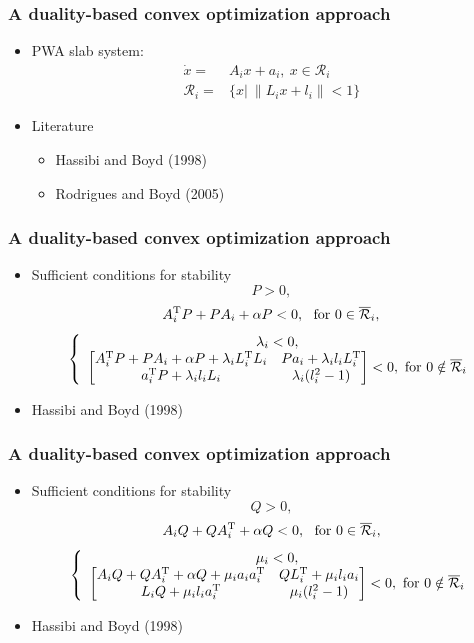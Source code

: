 \documentclass{beamer}
\newcommand{\TR}{\text{T}}
\newcommand{\RR}{{\cal R}}
\newcommand{\beq}{\begin{equation*}}
\newcommand{\eeq}{\end{equation*}}
\begin{document}
    \frame
  {
    \frametitle{A duality-based convex optimization approach}
    \begin{itemize}
    \item PWA slab system:
\begin{align}
\dot x =&A_{i}x+a_{i},\ x\in{\mathcal R}_i\nonumber\\
{\mathcal R}_i=& \{x|\ \|L_ix+l_i\|<1 \}\nonumber
\end{align}
\item Literature
\begin{itemize}
\item Hassibi and Boyd (1998)
\item Rodrigues and Boyd (2005)
\end{itemize}
\end{itemize}
  }

  \frame
  {
    \frametitle{A duality-based convex optimization approach}
    \begin{itemize}
\item Sufficient conditions for stability
\beq
P>0,
\eeq
\beq
A^\TR_{i}P+PA_{i}+\alpha P<0,\ \text{ for } 0\in \overline\RR_i,
\eeq
\beq
\left\{\begin{array}{c}
\lambda_{i}< 0,\\
	\left[\begin{matrix}
A^\TR_{i}P+PA_{i}+\alpha P+\lambda_{i}L_{i}^\TR L_{i}&Pa_{i}+\lambda_{i}l_{i}L_{i}^\TR \\
	a_{i}^\TR P+\lambda_{i}l_{i} L_{i}&\lambda_{i}(l_{i}^2-1)\\
	\end{matrix}\right]< 0, \text{ for } 0\notin \overline\RR_i
\end{array}\right.
\eeq
\item {Hassibi and Boyd (1998)}
\end{itemize}
}
  \frame
  {
    \frametitle{A duality-based convex optimization approach}
    \begin{itemize}
\item Sufficient conditions for stability
\beq
Q>0,
\eeq
\beq
A_{i}Q+QA^\TR_{i}+\alpha Q<0,\  \text{ for } 0\in \overline\RR_i,
\eeq
\beq
\left\{\begin{array}{c}
\mu_{i}< 0,\\
	\left[\begin{matrix}
A_{i}Q+QA^\TR_{i}+\alpha Q+\mu_{i}a_{i} a_{i}^\TR&QL_{i}^\TR+\mu_{i}l_{i}a_{i}\\
	L_{i}Q+\mu_{i}l_{i} a_{i}^\TR&\mu_{i}(l_{i}^2-1)\\
	\end{matrix}\right]< 0,\text{ for } 0\notin \overline\RR_i
	\end{array}\right. 
\eeq
\item {Hassibi and Boyd (1998)}
\end{itemize}
}
\end{document}
